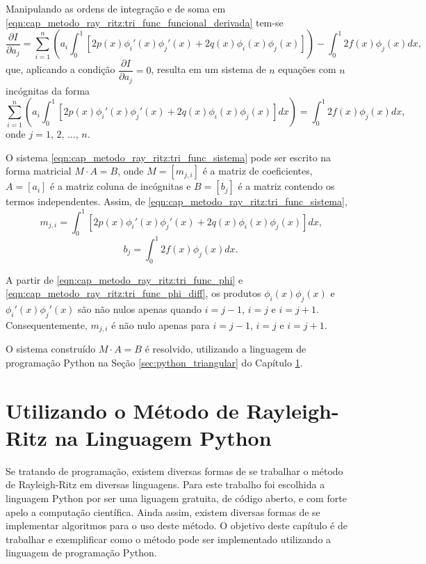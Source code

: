 \documentclass[
	12pt,				%
	openright,			%
    twoside,			%
	a4paper,			%
	english,			%
	french,				%
	spanish,			%
	brazil				%
	]{abntex2}
\numberwithin{lema}{chapter}
\numberwithin{teorema}{chapter}
\numberwithin{definicao}{chapter}
\numberwithin{exemplo}{chapter}
\numberwithin{figure}{chapter}
\begin{document}
Manipulando as ordens de integração e de soma em \eqref{eqn:cap_metodo_ray_ritz:tri_func_funcional_derivada} tem-se
$$
	\frac{\partial I}{\partial a_j} = \sum_{i=1}^{n} \left (
		a_i \int_{0}^{1} \left [
			2p(x)\phi_i'(x)\phi_j'(x)
			+
			2q(x)\phi_i(x)\phi_j(x)
		\right ]
	\right )
	-
	\int_{0}^{1} 2f(x)\phi_j(x)dx
	\text{,}
$$
que, aplicando a condição $\dfrac{\partial I}{\partial a_j}=0$, resulta em um sistema de $n$ equações com $n$ incógnitas da forma
\begin{equation}
	\label{eqn:cap_metodo_ray_ritz:tri_func_sistema}
	\sum_{i=1}^{n} \left (
		a_i \int_{0}^{1} \left [
			2p(x)\phi_i'(x)\phi_j'(x)
			+
			2q(x)\phi_i(x)\phi_j(x)
		\right ] dx
	\right )
	=
	\int_{0}^{1} 2f(x)\phi_j(x)dx
	\text{,}
\end{equation}
onde $j=1$, $2$, $\dots$, $n$.

O sistema \eqref{eqn:cap_metodo_ray_ritz:tri_func_sistema} pode ser escrito na forma matricial $M\cdot A=B$, onde $M=[m_{j, i}]$ é a matriz de coeficientes, $A=[a_i]$ é a matriz coluna de incógnitas e $B=[b_j]$ é a matriz contendo os termos independentes. Assim, de \eqref{eqn:cap_metodo_ray_ritz:tri_func_sistema},
\begin{equation}
	\label{eqn:cap_metodo_ray_ritz:tri_func_mji}
	m_{j,i}=\int_{0}^{1} \left [
		2p(x)\phi_i'(x)\phi_j'(x)
		+
		2q(x)\phi_i(x)\phi_j(x)
	\right ]dx
	\text{,}
\end{equation}
\begin{equation}
	\label{eqn:cap_metodo_ray_ritz:tri_func_bj}
	b_j=\int_{0}^{1} 2f(x)\phi_j(x)dx
	\text{.}
\end{equation}

A partir de \eqref{eqn:cap_metodo_ray_ritz:tri_func_phi} e \eqref{eqn:cap_metodo_ray_ritz:tri_func_phi_diff}, os produtos $\phi_i(x)\phi_j(x)$ e $\phi_i'(x)\phi_j'(x)$ são não nulos apenas quando $i=j-1$, $i=j$ e $i=j+1$. Consequentemente, $m_{j,i}$ é não nulo apenas para $i=j-1$, $i=j$ e $i=j+1$.

O sistema construído $M\cdot A=B$ é resolvido, utilizando a linguagem de programação Python na Seção \ref{sec:python_triangular} do Capítulo \ref{cap:python}.

\chapter{Utilizando o Método de Rayleigh-Ritz na Linguagem Python}
\label{cap:python}

Se tratando de programação, existem diversas formas de se trabalhar o método de Rayleigh-Ritz em diversas linguagens. Para este trabalho foi escolhida a linguagem Python por ser uma liguagem gratuita, de código aberto, e com forte apelo a computação científica. Ainda assim, existem diversas formas de se implementar algoritmos para o uso deste método. O objetivo deste capítulo é de trabalhar e exemplificar como o método pode ser implementado utilizando a linguagem de programação Python.
\end{document}
